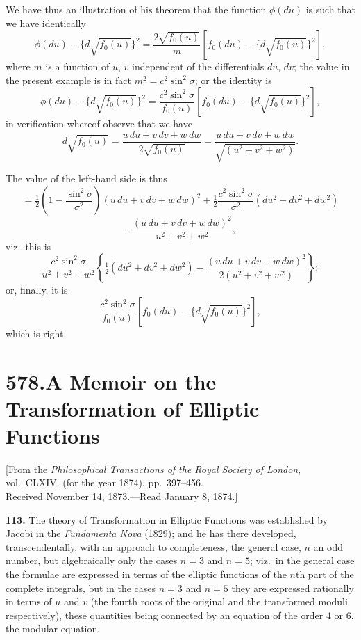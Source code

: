 \documentclass[11pt,a4paper]{article}
\theoremstyle{plain}
\begin{document}
We have thus an illustration of his theorem that the function $\phi(du)$ is such that we have identically
\[
\phi(du) - \{d\sqrt{f_0(u)}\}^2 = \frac{2\sqrt{f_0(u)}}{m}\left[f_0(du) - \{d\sqrt{f_0(u)}\}^2\right],
\]
where $m$ is a function of $u$, $v$ independent of the differentials $du$, $dv$; the value in the present example is in fact $m^2 = c^2\sin^2\sigma$; or the identity is
\[
\phi(du) - \{d\sqrt{f_0(u)}\}^2 = \frac{c^2\sin^2\sigma}{f_0(u)}\left[f_0(du) - \{d\sqrt{f_0(u)}\}^2\right],
\]
in verification whereof observe that we have
\[
d\sqrt{f_0(u)} = \frac{u\,du + v\,dv + w\,dw}{2\sqrt{f_0(u)}} = \frac{u\,du + v\,dv + w\,dw}{\sqrt{(u^2 + v^2 + w^2)}}.
\]

The value of the left-hand side is thus
\[
= \tfrac{1}{2}\left(1 - \frac{\sin^2\sigma}{\sigma^2}\right)(u\,du + v\,dv + w\,dw)^2 + \tfrac{1}{2}\frac{c^2\sin^2\sigma}{\sigma^2}(du^2 + dv^2 + dw^2)
\]
\[
- \frac{(u\,du + v\,dv + w\,dw)^2}{u^2 + v^2 + w^2},
\]
viz.\ this is
\[
\frac{c^2\sin^2\sigma}{u^2 + v^2 + w^2}\left\{\tfrac{1}{2}(du^2 + dv^2 + dw^2) - \frac{(u\,du + v\,dv + w\,dw)^2}{2(u^2 + v^2 + w^2)}\right\};
\]
or, finally, it is
\[
\frac{c^2\sin^2\sigma}{f_0(u)}\left[f_0(du) - \{d\sqrt{f_0(u)}\}^2\right],
\]
which is right.



\newpage
\section*{578.\quad A Memoir on the Transformation of Elliptic Functions}

\begin{flushright}
\small[From the \textit{Philosophical Transactions of the Royal Society of London},\\ vol.~CLXIV. (for the year 1874), pp.~397--456.\\ Received November 14, 1873.---Read January 8, 1874.]
\end{flushright}

\noindent\textbf{113.} The theory of Transformation in Elliptic Functions was established by Jacobi in the \textit{Fundamenta Nova} (1829); and he has there developed, transcendentally, with an approach to completeness, the general case, $n$ an odd number, but algebraically only the cases $n = 3$ and $n = 5$; viz.\ in the general case the formulae are expressed in terms of the elliptic functions of the $n$th part of the complete integrals, but in the cases $n = 3$ and $n = 5$ they are expressed rationally in terms of $u$ and $v$ (the fourth roots of the original and the transformed moduli respectively), these quantities being connected by an equation of the order 4 or 6, the modular equation.
\end{document}
